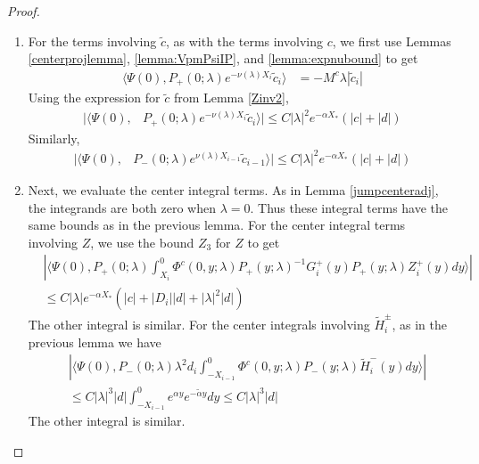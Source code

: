 \documentclass[thesis.tex]{subfiles}
\begin{document}
\begin{lemma}
\begin{proof}
\begin{enumerate}
\item For the terms involving $\tilde{c}$, as with the terms involving $c$, we first use Lemmas \ref{centerprojlemma}, \ref{lemma:VpmPsiIP}, and \cref{lemma:expnubound} to get
\begin{align*}
\langle \Psi(0), P_+(0; \lambda) e^{-\nu(\lambda) X_i}\tilde{c}_i \rangle &= -M^c \lambda |\tilde{c}_i|
\end{align*}
Using the expression for $\tilde{c}$ from Lemma \ref{Zinv2},
\begin{align*}
|\langle \Psi(0), &P_+(0; \lambda) e^{-\nu(\lambda) X_i}\tilde{c}_i \rangle| \leq C |\lambda|^2 e^{-\alpha X_*} \left( |c| + |d| \right) 
\end{align*}
Similarly,
\begin{align*}
|\langle \Psi(0), &P_-(0; \lambda) e^{\nu(\lambda) X_{i-1}} \tilde{c}_{i-1} \rangle| \leq C |\lambda|^2 e^{-\alpha X_*} \left( |c| + |d| \right)
\end{align*}

\item Next, we evaluate the center integral terms. As in Lemma \ref{jumpcenteradj}, the integrands are both zero when $\lambda = 0$. Thus these integral terms have the same bounds as in the previous lemma. For the center integral terms involving $Z$, we use the bound $Z_3$ for $Z$ to get
\begin{align*}
&\left| \langle \Psi(0), P_+(0; \lambda) \int_{X_i}^0 \Phi^c(0, y; \lambda) P_+(y; \lambda)^{-1} G_i^+(y) P_+(y; \lambda) Z_i^+(y) dy \rangle \right| \\
&\leq C |\lambda| e^{-\alpha X_*}\left(|c| + |D_i||d| + |\lambda|^2|d|\right)
\end{align*}
The other integral is similar. For the center integrals involving $\tilde{H}_i^\pm$, as in the previous lemma we have
\begin{align*}
&\left| \langle \Psi(0), P_-(0; \lambda) \lambda^2 d_i \int_{-X_{i-1}}^0 \Phi^c(0, y; \lambda) P_-(y; \lambda) \tilde{H}_i^-(y) dy \rangle \right| \\
&\leq C |\lambda|^3 |d| \int_{-X_{i-1}}^0 e^{\alpha y} e^{-\tilde{\alpha} y} dy \leq C |\lambda|^3 |d| 
\end{align*}
The other integral is similar.


\end{enumerate}
\end{proof}
\end{lemma}
\end{document}
